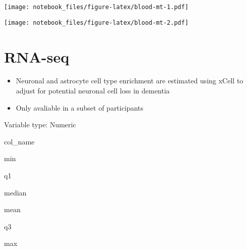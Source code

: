 \documentclass[]{book}
\newenvironment{Shaded}{\begin{snugshade}}{\end{snugshade}}
\newcommand{\DataTypeTok}[1]{\textcolor[rgb]{0.13,0.29,0.53}{#1}}
\newcommand{\KeywordTok}[1]{\textcolor[rgb]{0.13,0.29,0.53}{\textbf{#1}}}
\newcommand{\NormalTok}[1]{#1}
\newcommand{\OperatorTok}[1]{\textcolor[rgb]{0.81,0.36,0.00}{\textbf{#1}}}
\newcommand{\StringTok}[1]{\textcolor[rgb]{0.31,0.60,0.02}{#1}}
\providecommand{\tightlist}{%
  \setlength{\itemsep}{0pt}\setlength{\parskip}{0pt}}
\begin{document}
\texttt{[image: notebook\_files/figure-latex/blood-mt-1.pdf]}

\begin{Shaded}
\end{Shaded}

\texttt{[image: notebook\_files/figure-latex/blood-mt-2.pdf]}

\hypertarget{rna-seq}{%
\section{RNA-seq}\label{rna-seq}}

\begin{itemize}
\tightlist
\item
  Neuronal and astrocyte cell type enrichment are estimated using xCell to adjust
  for potential neuronal cell loss in dementia
\item
  Only avaliable in a subset of participants
\end{itemize}

\label{tab:rosmap-rna-numeric}Variable type: Numeric

col\_name

min

q1

median

mean

q3

max
\end{document}
